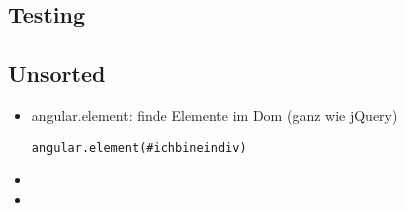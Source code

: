 \subsection{Testing}




\subsection{Unsorted}
\begin{itemize}
  \item angular.element: finde Elemente im Dom (ganz wie jQuery)
    \begin{verbatim}
angular.element(#ichbineindiv)
    \end{verbatim}
  \item
  \item
\end{itemize}
